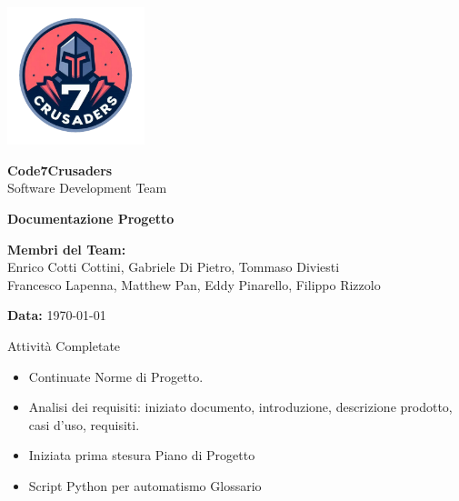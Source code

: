 \documentclass{beamer}
\begin{document}
\begin{frame}[plain] %
    \centering
    \vspace*{2cm}
    
    \includegraphics[width=0.3\textwidth]{../img/logo/7Crusaders_logo.png} %
    \vspace{1cm}
    
    {\Huge \textbf{Code7Crusaders}}\\
    \vspace{0.5cm}
    {\Large Software Development Team}\\
    \vspace{2cm}
    
    {\large \textbf{Documentazione Progetto}}\\
    \vspace{3cm}

    \textbf{Membri del Team:}\\
    Enrico Cotti Cottini, Gabriele Di Pietro, Tommaso Diviesti \\
    Francesco Lapenna, Matthew Pan, Eddy Pinarello, Filippo Rizzolo \\
    \vspace{1cm}
    
    {\large \textbf{Data:}} \today\\
    
    \vspace{1cm}
\end{frame}

\begin{frame}
    \begin{block}{Attività Completate}
        \begin{itemize}
            \item Continuate Norme di Progetto.
            \item Analisi dei requisiti: iniziato documento, introduzione, descrizione prodotto, casi d'uso, requisiti.
            \item Iniziata prima stesura Piano di Progetto
            \item Script Python per automatismo Glossario
        \end{itemize}
    \end{block}
\end{frame}
\end{document}
